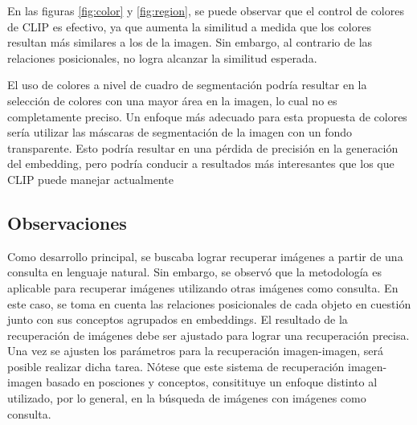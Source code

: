 En las figuras \ref{fig:color} y \ref{fig:region}, se puede observar que el control de colores de CLIP es efectivo, ya que aumenta la similitud a medida que los colores resultan más similares a los de la imagen. Sin embargo, al contrario de las relaciones posicionales, no logra alcanzar la similitud esperada.

El uso de colores a nivel de cuadro de segmentación podría resultar en la selección de colores con una mayor área en la imagen, lo cual no es completamente preciso. Un enfoque más adecuado para esta propuesta de colores sería utilizar las máscaras de segmentación de la imagen con un fondo transparente. Esto podría resultar en una pérdida de precisión en la generación del embedding, pero podría conducir a resultados más interesantes que los que CLIP puede manejar actualmente

 \subsection*{Observaciones}

Como desarrollo principal, se buscaba lograr recuperar imágenes a partir de una consulta en lenguaje natural. Sin embargo, se observó que la metodología es aplicable para recuperar imágenes utilizando otras imágenes como consulta. En este caso, se toma en cuenta las relaciones posicionales de cada objeto en cuestión junto con sus conceptos agrupados en embeddings. El resultado de la recuperación de imágenes debe ser ajustado para lograr una recuperación precisa. Una vez se ajusten los parámetros para la recuperación imagen-imagen, será posible realizar dicha tarea. N\'otese que este sistema de recuperaci\'on imagen-imagen basado en posciones y conceptos, consitituye un enfoque distinto al utilizado, por lo general, en la b\'usqueda de im\'agenes con im\'agenes como consulta.